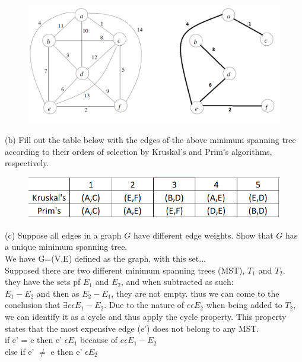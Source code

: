 \documentclass[11pt]{amsart}
\begin{document}
\begin{figure}[htb]
\begin{center}
\includegraphics[width=\textwidth]{1a}
\end{center}
\end{figure}

(b) Fill out the table below with the edges of the above minimum spanning tree according to their orders of selection by Kruskal's 
and Prim's algorithms, respectively.

\begin{figure}[htb]
\begin{center}
\includegraphics[width=\textwidth]{1b}
\end{center}
\end{figure}

(c) Suppose all edges in a graph $G$ have different edge weights. Show that $G$ has a unique minimum spanning tree. 
\smallskip
\\
We have G=(V,E) defined as the graph, with this set...\\
Supposed there are two different minimum spanning trees (MST), $T_1$ and $T_2$. they have the sets pf $E_1$ and $E_2$, and when subtracted as such: 
\\$E_1 - E_2$ and then as $E_2 - E_1$, they are not empty. thus we can come to the conclusion that $\exists e \epsilon  E_1 - E_2$. Due to the nature of $e \epsilon E_2$ when being added to $T_2$, we can identify it as a cycle and thus apply the cycle property. This property states that the most expensive edge (e') does not belong to any MST.\\
if e' = e then e' $\epsilon E_1$ because of $e \epsilon E_1 - E_2$\\
else if e' $\neq$ e then e' $\epsilon E_2$
\newpage
\hrulefill \\
\end{document}
